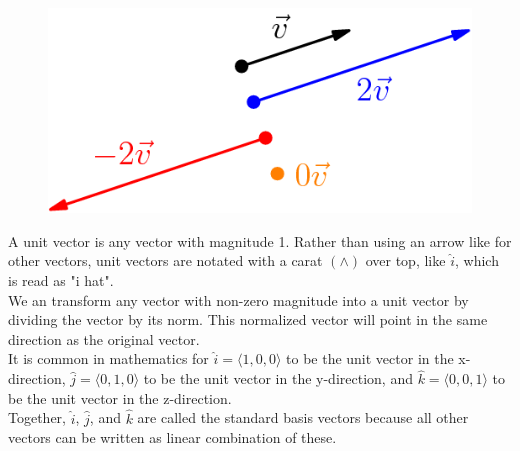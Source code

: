 \begin{figure}[H]
	\centering
	\includegraphics[scale=0.5]{Images/backgroundReview/ScalarMultiples}
\end{figure}

\noindent
A unit vector is any vector with magnitude 1. Rather than using an arrow like for other vectors, unit vectors are notated with a carat $\left(\wedge \right)$ over top, like $\hat{i}$, which is read as "i hat".\\
We an transform any vector with non-zero magnitude into a unit vector by dividing the vector by its norm. This normalized vector will point in the same direction as the original vector.\\

\noindent
It is common in mathematics for $\hat{i} = \langle 1,0,0 \rangle$ to be the unit vector in the x-direction, $\hat{j} = \langle 0,1,0 \rangle$ to be the unit vector in the y-direction, and $\hat{k} = \langle 0,0,1 \rangle$ to be the unit vector in the z-direction.\\
Together, $\hat{i}$, $\hat{j}$, and $\hat{k}$ are called the standard basis vectors because all other vectors can be written as linear combination of these.

